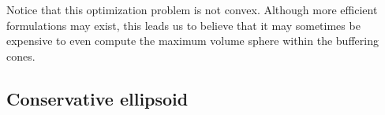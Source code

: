 % 
% 
% 
% 
% 
% 
% 

Notice that this optimization problem is not convex.
Although more efficient formulations may exist, this leads us to believe that it may sometimes be expensive
to even compute the maximum volume sphere within the buffering cones.


\subsection{Conservative ellipsoid}
\label{the_conservative_ellipsoid}

